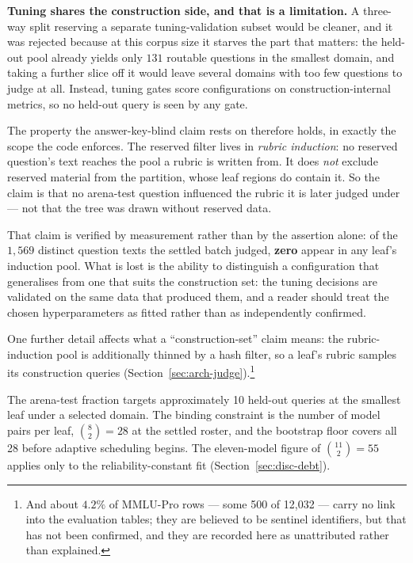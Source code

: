 \textbf{Tuning shares the construction side, and that is a
limitation.} A three-way split reserving a separate tuning-validation
subset would be cleaner, and it was rejected because at this corpus size
it starves the part that matters: the held-out pool already yields only
$131$ routable questions in the smallest domain, and taking a further
slice off it would leave several domains with too few questions to judge
at all. Instead, tuning gates score configurations on
construction-internal metrics, so no held-out query is seen by any gate.

The property the answer-key-blind claim rests on therefore holds, in
exactly the scope the code enforces. The reserved filter lives
in \emph{rubric induction}: no reserved question's text reaches the pool a
rubric is written from. It does \emph{not} exclude reserved material from the
partition, whose leaf regions do contain it. So the claim is that no
arena-test question influenced the rubric it is later judged under --- not
that the tree was drawn without reserved data.

That claim is verified by measurement rather than by the assertion alone: of
the $1{,}569$ distinct question texts the settled batch judged, \textbf{zero}
appear in any leaf's induction pool.
What is lost is the ability to distinguish a configuration that
generalises from one that suits the construction set: the tuning
decisions are validated on the same data that produced them, and a
reader should treat the chosen hyperparameters as fitted rather than as
independently confirmed.

One further detail affects what a ``construction-set'' claim means:
the rubric-induction pool is additionally thinned by a hash filter, so
a leaf's rubric samples its construction queries
(Section~\ref{sec:arch-judge}).\footnote{And about $4.2\%$ of MMLU-Pro
rows --- some 500 of 12{,}032 --- carry no link into the evaluation
tables; they are believed to be sentinel identifiers, but that has not
been confirmed, and they are recorded here as unattributed rather than
explained.}

The arena-test fraction targets approximately 10 held-out queries at
the smallest leaf under a selected domain. The binding constraint is
the number of model pairs per leaf, $\binom{8}{2} = 28$ at the settled
roster, and the bootstrap floor covers all 28 before adaptive
scheduling begins. The eleven-model figure of $\binom{11}{2} = 55$
applies only to the reliability-constant fit
(Section~\ref{sec:disc-debt}).

